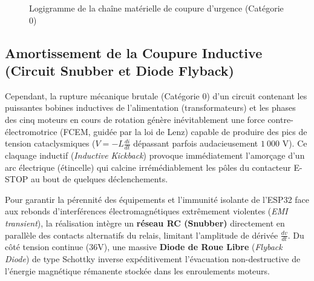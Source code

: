 \begin{figure}[htbp]
    \centering
    \caption{Logigramme de la chaîne matérielle de coupure d'urgence (Catégorie 0)}
    \label{fig:estop_logic}
\end{figure}

\subsection{Amortissement de la Coupure Inductive (Circuit Snubber et Diode Flyback)}
Cependant, la rupture mécanique brutale (Catégorie 0) d'un circuit contenant les puissantes bobines inductives de l'alimentation (transformateurs) et les phases des cinq moteurs en cours de rotation génère inévitablement une force contre-électromotrice (FCEM, guidée par la loi de Lenz) capable de produire des pics de tension cataclysmiques ($V = -L \frac{di}{dt}$ dépassant parfois audacieusement $1~000\text{ V}$). Ce claquage inductif (\textit{Inductive Kickback}) provoque immédiatement l'amorçage d'un arc électrique (étincelle) qui calcine irrémédiablement les pôles du contacteur E-STOP au bout de quelques déclenchements.

Pour garantir la pérennité des équipements et l'immunité isolante de l'ESP32 face aux rebonds d'interférences électromagnétiques extrêmement violentes (\textit{EMI transient}), la réalisation intègre un \textbf{réseau RC (Snubber)} directement en parallèle des contacts alternatifs du relais, limitant l'amplitude de dérivée $\frac{dv}{dt}$. Du côté tension continue ($36\text{V}$), une massive \textbf{Diode de Roue Libre} (\textit{Flyback Diode}) de type Schottky inverse expéditivement l'évacuation non-destructive de l'énergie magnétique rémanente stockée dans les enroulements moteurs.

